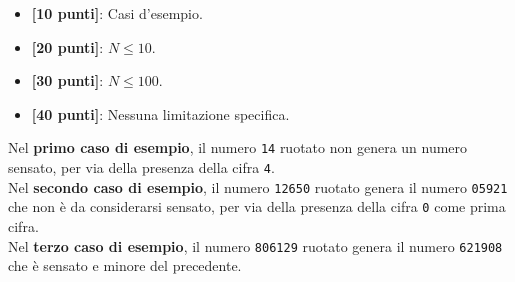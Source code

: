 \begin{itemize}[nolistsep,itemsep=2mm]
  \item \textbf{ [10 punti]}: Casi d'esempio.
  \item \textbf{ [20 punti]}: $N \leq 10$.
  \item \textbf{ [30 punti]}: $N \leq 100$.
  \item \textbf{ [40 punti]}: Nessuna limitazione specifica.
\end{itemize}

\Examples
\begin{example}
%
\end{example}
\begin{example}
%
\end{example}
\begin{example}
%
\end{example}


\Explanation
Nel \textbf{primo caso di esempio}, il numero \texttt{14} ruotato non genera un numero sensato, per via della presenza della cifra \texttt{4}.\\[2mm]
Nel \textbf{secondo caso di esempio}, il numero \texttt{12650} ruotato genera il numero \texttt{05921} che non è da considerarsi sensato, per via della presenza della cifra \texttt{0} come prima cifra.\\[2mm]
Nel \textbf{terzo caso di esempio}, il numero \texttt{806129} ruotato genera il numero \texttt{621908} che è sensato e minore del precedente.
